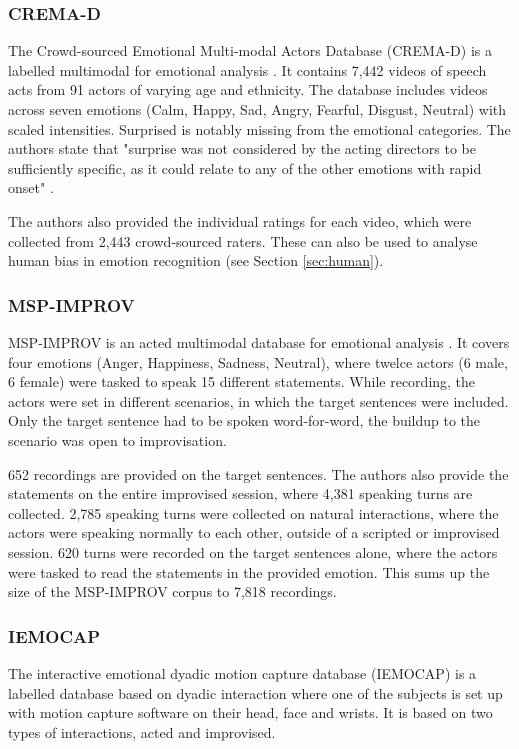 \subsubsection{CREMA-D}
The Crowd-sourced Emotional Multi-modal Actors Database (CREMA-D) is a labelled multimodal for emotional analysis \cite{cao2014crema}. It contains 7,442 videos of speech acts from 91 actors of varying age and ethnicity. The database includes videos across seven emotions (Calm, Happy, Sad, Angry, Fearful, Disgust, Neutral) with scaled intensities. Surprised is notably missing from the emotional categories. The authors state that "surprise was not considered by the acting directors to be sufficiently specific, as it could relate to any of the other emotions with rapid onset" \cite{cao2014crema}. 

The authors also provided the individual ratings for each video, which were collected from 2,443 crowd-sourced raters. These can also be used to analyse human bias in emotion recognition (see Section \ref{sec:human}).

\subsubsection{MSP-IMPROV}
MSP-IMPROV is an acted multimodal database for emotional analysis \cite{busso2016msp}. It covers four emotions (Anger, Happiness, Sadness, Neutral), where twelce actors (6 male, 6 female) were tasked to speak 15 different statements. While recording, the actors were set in different scenarios, in which the target sentences were included. Only the target sentence had to be spoken word-for-word, the buildup to the scenario was open to improvisation.

652 recordings are provided on the target sentences. The authors also provide the statements on the entire improvised session, where 4,381 speaking turns are collected. 2,785 speaking turns were collected on natural interactions, where the actors were speaking normally to each other, outside of a scripted or improvised session. 620 turns were recorded on the target sentences alone, where the actors were tasked to read the statements in the provided emotion. This sums up the size of the MSP-IMPROV corpus to 7,818 recordings. 

\subsubsection{IEMOCAP}
The interactive emotional dyadic motion capture database (IEMOCAP) \cite{busso2008iemocap} is a labelled database based on dyadic interaction where one of the subjects is set up with motion capture software on their head, face and wrists. It is based on two types of interactions, acted and improvised.

